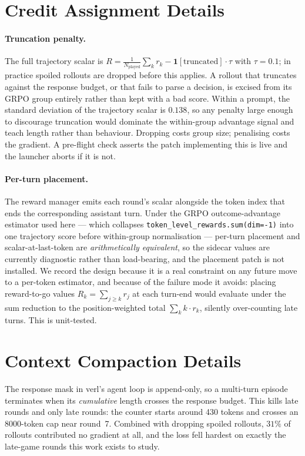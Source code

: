 \documentclass{article}
\begin{document}
\section{Credit Assignment Details}
\label{app:credit}

\paragraph{Truncation penalty.} The full trajectory scalar is
$R = \frac{1}{N_{\text{played}}}\sum_k r_k -
\mathbf{1}[\text{truncated}]\cdot\tau$ with $\tau = 0.1$; in practice spoiled
rollouts are dropped before this applies. A rollout that truncates against the
response budget, or that fails to parse a decision, is excised from its GRPO
group entirely rather than kept with a bad score. Within a prompt, the
standard deviation of the trajectory scalar is $0.138$, so any penalty large
enough to discourage truncation would dominate the within-group advantage
signal and teach length rather than behaviour. Dropping costs group size;
penalising costs the gradient. A pre-flight check asserts the patch
implementing this is live and the launcher aborts if it is not.

\paragraph{Per-turn placement.} The reward manager emits each round's scalar
alongside the token index that ends the corresponding assistant turn. Under
the GRPO outcome-advantage estimator used here --- which collapses
\texttt{token\_level\_rewards.sum(dim=-1)} into one trajectory score before
within-group normalisation --- per-turn placement and scalar-at-last-token are
\emph{arithmetically equivalent}, so the sidecar values are currently
diagnostic rather than load-bearing, and the placement patch is not installed.
We record the design because it is a real constraint on any future move to a
per-token estimator, and because of the failure mode it avoids: placing
reward-to-go values $R_k = \sum_{j\geq k} r_j$ at each turn-end would evaluate
under the sum reduction to the position-weighted total $\sum_k k\cdot r_k$,
silently over-counting late turns. This is unit-tested.

\section{Context Compaction Details}
\label{app:compaction}

The response mask in verl's agent loop is append-only, so a multi-turn episode
terminates when its \emph{cumulative} length crosses the response budget. This
kills late rounds and only late rounds: the counter starts around 430 tokens
and crosses an 8000-token cap near round~7. Combined with dropping spoiled
rollouts, $31\%$ of rollouts contributed no gradient at all, and the loss fell
hardest on exactly the late-game rounds this work exists to study.
\end{document}
